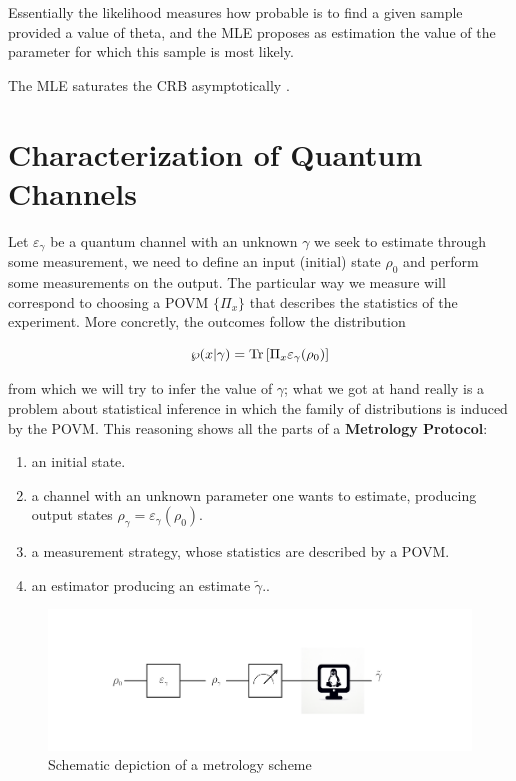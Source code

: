 Essentially the likelihood measures how probable is to find a given sample provided a value of theta, and the MLE proposes as estimation the
value of the parameter for which this sample is most likely.

\begin{theorem}
The MLE saturates the CRB asymptotically \cite{kay1993fundamentals}.
\end{theorem}

\section{Characterization of Quantum Channels}
Let $\varepsilon_{\gamma}$ be a quantum channel with an unknown $\gamma$ we seek to estimate through some measurement,  we
need to define an input (initial) state $\rho_{0}$ and perform some measurements on the output. The particular way we measure will
correspond to choosing a POVM $\{\Pi_{x}\}$ that describes the statistics of the experiment. More concretly, the outcomes follow the distribution

\begin{equation}
  \wp(x|\gamma) = \mathrm{Tr}\left[\Pi_{x}\varepsilon_{\gamma}(\rho_{0})\right]
\end{equation}

 from which we will try to infer the value of $\gamma$;  what we got at hand really is a problem about statistical inference in which the family of distributions is induced by the POVM.
This reasoning shows all the parts of a \textbf{Metrology Protocol}:

\begin{enumerate}
  \item an initial state.
  \item a channel with an unknown parameter one wants to estimate, producing output states $\rho_{\gamma} = \varepsilon_{\gamma}(\rho_{0})$.

  \item a measurement strategy, whose statistics are described by a POVM.
  \item an estimator producing an estimate $\tilde\gamma$..
\end{enumerate}
\begin{figure}[h]
  \centering
  \includegraphics[scale=0.5]{CodeImages/Esquema_Estimacion.pdf}
  \caption{Schematic depiction of a metrology scheme}
  \label{fig:metrology_scheme}
\end{figure}

